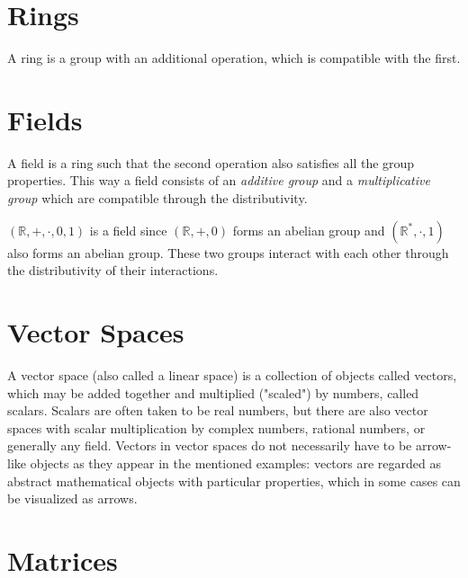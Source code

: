 \section{Rings}
A ring is a group with an additional operation, which is compatible with the first.

\section{Fields}
A field is a ring such that the second operation also satisfies all the group properties.
This way a field consists of an \textit{additive group} and a \textit{multiplicative group} which are compatible through the distributivity.

\begin{example}
   \((\mathbb{R}, +, \cdot, 0, 1)\) is a field since \((\mathbb{R}, +, 0)\) forms an abelian group and \((\mathbb{R}^*, \cdot, 1)\) also forms an abelian group.
   These two groups interact with each other through the distributivity of their interactions.
\end{example}

\section{Vector Spaces}
A vector space (also called a linear space) is a collection of objects called vectors, which may be added together and multiplied ("scaled") by numbers, called scalars.
Scalars are often taken to be real numbers, but there are also vector spaces with scalar multiplication by complex numbers, rational numbers, or generally any field.
Vectors in vector spaces do not necessarily have to be arrow-like objects as they appear in the mentioned examples: vectors are regarded as abstract mathematical objects with particular properties, which in some cases can be visualized as arrows.

\section{Matrices}

